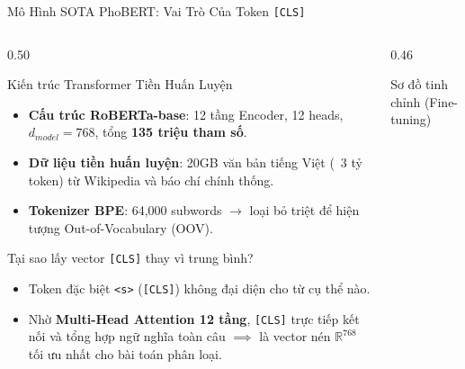\documentclass[aspectratio=169, 10pt]{beamer}
\begin{document}
\begin{frame}{Mô Hình SOTA PhoBERT: Vai Trò Của Token \texttt{[CLS]}}
  \begin{columns}[T, onlytextwidth]
    \begin{column}{0.50\textwidth}
      \begin{block}{Kiến trúc Transformer Tiền Huấn Luyện}
        \fontsize{7.5}{9.5}\selectfont
        \begin{itemize}\setlength{\itemsep}{0.2em}
          \item \textbf{Cấu trúc RoBERTa-base}: 12 tầng Encoder, 12 heads, $d_{model} = 768$, tổng \textbf{135 triệu tham số}.
          \item \textbf{Dữ liệu tiền huấn luyện}: 20GB văn bản tiếng Việt (~3 tỷ token) từ Wikipedia và báo chí chính thống.
          \item \textbf{Tokenizer BPE}: 64,000 subwords $\to$ loại bỏ triệt để hiện tượng Out-of-Vocabulary (OOV).
        \end{itemize}
      \end{block}
      \vspace{0.15cm}
      \begin{exampleblock}{Tại sao lấy vector \texttt{[CLS]} thay vì trung bình?}
        \fontsize{7.5}{9.5}\selectfont
        \begin{itemize}\setlength{\itemsep}{0.15em}
          \item Token đặc biệt \texttt{<s>} (\texttt{[CLS]}) không đại diện cho từ cụ thể nào.
          \item Nhờ \textbf{Multi-Head Attention 12 tầng}, \texttt{[CLS]} trực tiếp kết nối và tổng hợp ngữ nghĩa toàn câu $\implies$ là vector nén $\mathbb{R}^{768}$ tối ưu nhất cho bài toán phân loại.
        \end{itemize}
      \end{exampleblock}
    \end{column}
    \hfill
    \begin{column}{0.46\textwidth}
      \begin{block}{Sơ đồ tinh chỉnh (Fine-tuning)}
        \fontsize{7.5}{9}\selectfont
        \centering
\end{block}
\end{column}
\end{columns}
\end{frame}
\end{document}
